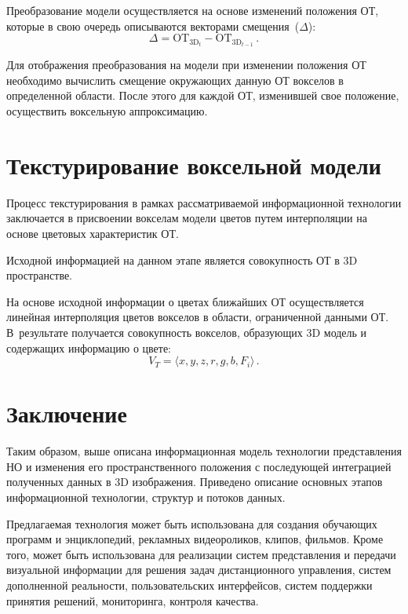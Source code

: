 \begin{multicols}{2}
  Преобразование модели осуществляется на основе изменений положения ОТ, 
которые в свою очередь описываются векторами смещения~($\Delta$):
  $$
  \Delta =\mathrm{OT}_{\mathrm{3D}_t}-\mathrm{OT}_{\mathrm{3D}_{t-1}}\,.
  $$
  
  Для отображения преобразования на модели при изменении положения ОТ 
необходимо вы\-чис\-лить смещение окружающих данную ОТ
вокселов в определенной области. После этого для каждой ОТ, изменившей 
свое положение, осуществить воксельную аппроксимацию.
  
\section{Текстурирование воксельной модели}

  Процесс текстурирования в рамках рассматриваемой информационной 
технологии заключается в присвоении вокселам модели цветов путем 
интерполяции на основе цветовых характеристик ОТ.
  
  Исходной информацией на данном этапе является совокупность ОТ в 
3D пространстве.
  
  На основе исходной информации о цветах ближайших ОТ осуществляется 
линейная интерполяция цветов вокселов в области, ограниченной данными ОТ. 
В~результате получается совокупность вокселов, образующих 3D
модель и содержащих информацию о цвете:
  $$
  V_T= \langle x, y, z, r, g, b, F_i\rangle\,.
  $$
  
\vspace*{-9pt}

\section{Заключение}


  Таким образом, выше описана информационная модель технологии 
представления НО и изменения его пространственного 
положения с по\-сле\-ду\-ющей интеграцией полученных данных в 3D\linebreak
изображения. Приведено описание основных этапов информационной 
технологии, структур и потоков данных.
  
  Предлагаемая технология может быть исполь\-зована для создания обучающих 
программ и энциклопедий, рекламных видеороликов, клипов, фильмов. Кроме 
того, может быть использована для реализа\-ции систем представления и 
передачи визуальной информации для решения задач дистанционного 
управ\-ле\-ния, сис\-тем дополненной реальности, пользовательских интерфейсов, 
сис\-тем поддержки принятия решений, мониторинга, контроля качества. 


\end{multicols}
